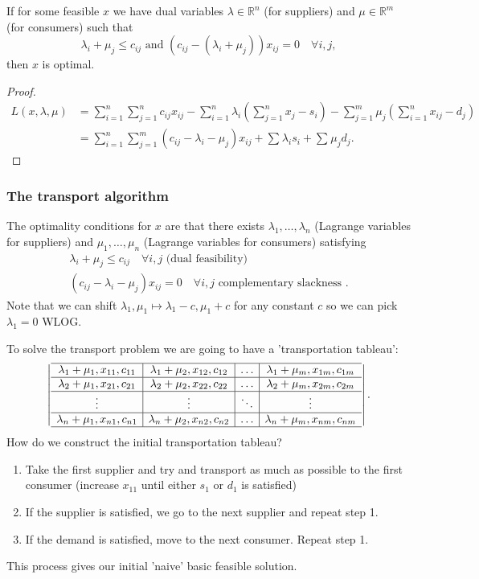 \documentclass[a4paper]{scrartcl}
\begin{document}
\begin{theorem}
	 If for some feasible $x$ we have dual variables $\lambda \in \mathbb{R}^{n} $ (for suppliers) and $\mu \in \mathbb{R}^{m} $ (for consumers) such that \[
	 \lambda_{i}+\mu_{j} \leq c_{ij} \text{  and  } (c_{ij}-(\lambda_{i}+\mu_j))x_{ij}=0 \quad  \forall i,j 
	 ,\] then $x$ is optimal.
\end{theorem}
\begin{proof}
	 \begin{align*}
		L (x,\lambda,\mu)&=\sum_{i=1}^{n}\sum_{j=1}^{n}c_{ij}x_{ij}-\sum_{i=1}^{n}\lambda_{i}(\sum_{j=1}^{n}x_{j}-s_i) - \sum_{j=1}^{m}\mu_{j} (\sum_{i=1}^{n}x_{ij}-d_{j})\\&=\sum_{i=1}^{n}\sum_{j=1}^{m}(c_{ij}-\lambda_{i}-\mu_{j})x_{ij}+\sum_{}^{}\lambda_{i}s_i +\sum_{}^{}\mu_{j}d_{j}.
	 \end{align*}
\end{proof}
\subsubsection{The transport algorithm}
The optimality conditions for $x$ are that there exists $\lambda_1 ,\ldots , \lambda_n$ (Lagrange variables for suppliers) and $\mu_1 ,\ldots ,\mu_{n}$ (Lagrange variables for consumers) satisfying 
\begin{align*}
	\lambda_{i} +\mu_{j} \leq c_{ij} \quad \forall i,j \text{ (dual feasibility) } \\
	(c_{ij}-\lambda_{i}-\mu_{j})x_{ij}=0 \quad \forall i,j \text{ complementary slackness }.
\end{align*}
Note that we can shift $\lambda_{1}, \mu_{1} \mapsto \lambda_{1}-c, \mu_{1}+c$ for any constant $c$ so we can pick $\lambda_1 =0$ WLOG.

To solve the transport problem we are going to have a 'transportation tableau': \[
\left|
	\begin{array}{c|c|c|c}
		\hline
		\lambda_1 +\mu_1 , x_{11} , c_{11} & \lambda_1 +\mu_2 , x_{12} , c_{12}&\ldots & \lambda_1 +\mu_m , x_{1m} , c_{1m}\\
		\hline
		\lambda_2 +\mu_1 , x_{21} , c_{21} & \lambda_2 +\mu_2 , x_{22} , c_{22}&\ldots & \lambda_2 +\mu_m , x_{2m} , c_{2m}\\
		\hline
		\vdots & \vdots &\ddots &\vdots \\
		\hline
		\lambda_n +\mu_1 , x_{n1} , c_{n1} & \lambda_n +\mu_2 , x_{n2} , c_{n2}&\ldots & \lambda_n +\mu_m , x_{nm} , c_{nm}\\
		\hline
	\end{array}
\right|
.\] 
 How do we construct the initial transportation tableau? 
 \begin{enumerate}
	 \item Take the first supplier and try and transport as much as possible to the first consumer (increase $x_{11} $ until either $s_1$ or $d_1 $ is satisfied)
	 \item If the supplier is satisfied, we go to the next supplier and repeat step 1.
	 \item If the demand is satisfied, move to the next consumer. Repeat step 1.
 \end{enumerate}  
 This process gives our initial 'naive' basic feasible solution. 
\end{document}
